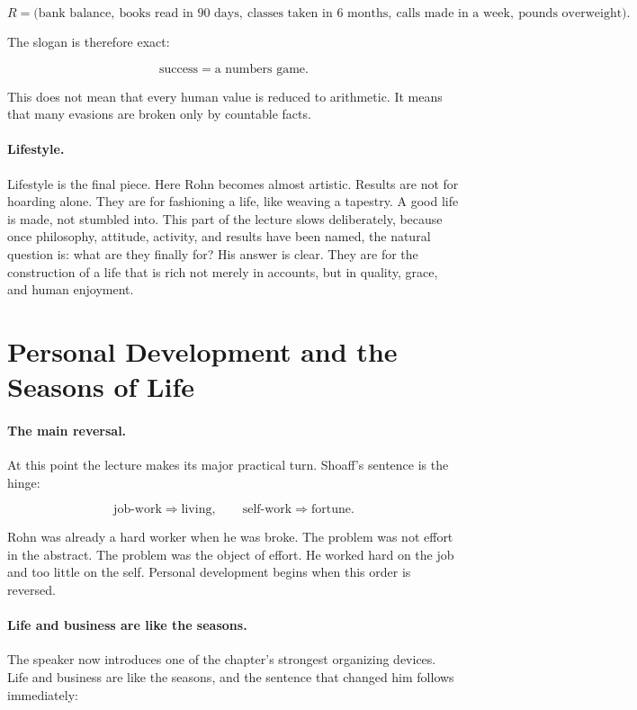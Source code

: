 \begin{equation}
R=\bigl(\text{bank balance},\ \text{books read in 90 days},\ \text{classes taken in 6 months},\ \text{calls made in a week},\ \text{pounds overweight}\bigr).
\end{equation}

The slogan is therefore exact:

\begin{equation}
\text{success}=\text{a numbers game}.
\end{equation}

This does not mean that every human value is reduced to arithmetic. It means that many evasions are broken only by countable facts.

\paragraph{Lifestyle.}
Lifestyle is the final piece. Here Rohn becomes almost artistic. Results are not for hoarding alone. They are for fashioning a life, like weaving a tapestry. A good life is made, not stumbled into. This part of the lecture slows deliberately, because once philosophy, attitude, activity, and results have been named, the natural question is: what are they finally for? His answer is clear. They are for the construction of a life that is rich not merely in accounts, but in quality, grace, and human enjoyment.

\section{Personal Development and the Seasons of Life}

\paragraph{The main reversal.}
At this point the lecture makes its major practical turn. Shoaff's sentence is the hinge:

\begin{equation}
\text{job-work}\Rightarrow \text{living}, \qquad \text{self-work}\Rightarrow \text{fortune}.
\end{equation}

Rohn was already a hard worker when he was broke. The problem was not effort in the abstract. The problem was the object of effort. He worked hard on the job and too little on the self. Personal development begins when this order is reversed.

\paragraph{Life and business are like the seasons.}
The speaker now introduces one of the chapter's strongest organizing devices. Life and business are like the seasons, and the sentence that changed him follows immediately:

